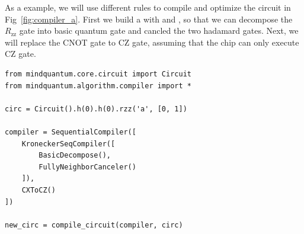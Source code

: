 As a example, we will use different rules to compile and optimize the circuit in Fig~\ref{fig:compiler_a}. First we build a \KroneckerSeqCompiler with \BasicDecompose and \FullyNeighborCanceler, so that we can decompose the $R_\text{zz}$ gate into basic quantum gate and cancled the two hadamard gates. Next, we will replace the CNOT gate to CZ gate, assuming that the chip can only execute CZ gate.
\begin{lstlisting}
from mindquantum.core.circuit import Circuit
from mindquantum.algorithm.compiler import *

circ = Circuit().h(0).h(0).rzz('a', [0, 1])

compiler = SequentialCompiler([
    KroneckerSeqCompiler([
        BasicDecompose(),
        FullyNeighborCanceler()
    ]),
    CXToCZ()
])

new_circ = compile_circuit(compiler, circ)
\end{lstlisting}

